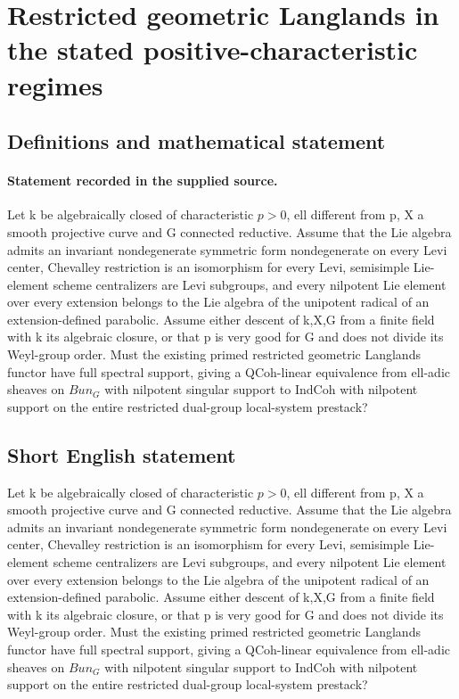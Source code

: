 \documentclass[11pt]{article}
\begin{document}
\section*{Restricted geometric Langlands in the stated positive-characteristic regimes}\label{30007282}
\subsection{Definitions and mathematical statement}
\paragraph{Statement recorded in the supplied source.}
Let k be algebraically closed of characteristic $p>0$, ell different from p, X a smooth projective curve and G connected reductive. Assume that the Lie algebra admits an invariant nondegenerate symmetric form nondegenerate on every Levi center, Chevalley restriction is an isomorphism for every Levi, semisimple Lie-element scheme centralizers are Levi subgroups, and every nilpotent Lie element over every extension belongs to the Lie algebra of the unipotent radical of an extension-defined parabolic. Assume either descent of k,X,G from a finite field with k its algebraic closure, or that p is very good for G and does not divide its Weyl-group order. Must the existing primed restricted geometric Langlands functor have full spectral support, giving a QCoh-linear equivalence from ell-adic sheaves on $Bun_G$ with nilpotent singular support to IndCoh with nilpotent support on the entire restricted dual-group local-system prestack?
\subsection{Short English statement}
Let k be algebraically closed of characteristic $p>0$, ell different from p, X a smooth projective curve and G connected reductive. Assume that the Lie algebra admits an invariant nondegenerate symmetric form nondegenerate on every Levi center, Chevalley restriction is an isomorphism for every Levi, semisimple Lie-element scheme centralizers are Levi subgroups, and every nilpotent Lie element over every extension belongs to the Lie algebra of the unipotent radical of an extension-defined parabolic. Assume either descent of k,X,G from a finite field with k its algebraic closure, or that p is very good for G and does not divide its Weyl-group order. Must the existing primed restricted geometric Langlands functor have full spectral support, giving a QCoh-linear equivalence from ell-adic sheaves on $Bun_G$ with nilpotent singular support to IndCoh with nilpotent support on the entire restricted dual-group local-system prestack?
\end{document}
